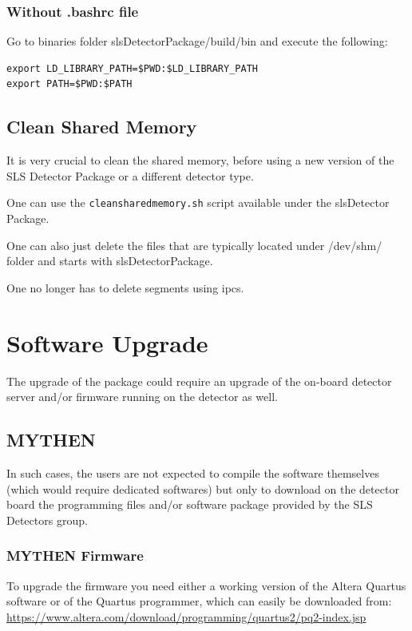 \documentclass{article}
\begin{document}
\subsubsection{Without .bashrc file}
Go to binaries folder slsDetectorPackage/build/bin and execute the following:
\begin{verbatim}
export LD_LIBRARY_PATH=$PWD:$LD_LIBRARY_PATH
export PATH=$PWD:$PATH
\end{verbatim}


\subsection{Clean Shared Memory}
It is very crucial to clean the shared memory, before using a new version of
the SLS Detector Package or a different detector type.

One can use the \verb=cleansharedmemory.sh= script available under the
slsDetector Package.

One can also just delete the files that are typically located under /dev/shm/ folder
and starts with slsDetectorPackage.

One no longer has to delete segments using ipcs.


\section{Software Upgrade}

The upgrade of the package could require an upgrade of the on-board detector
server and/or firmware running on the detector as well.


\subsection{MYTHEN}
In such cases, the users are not expected to compile the software
themselves (which would require dedicated softwares) but only to download on the
detector board the programming files and/or software package provided by
the SLS Detectors group.

\subsubsection{MYTHEN Firmware}

To upgrade the firmware you need either a working version of the Altera
Quartus software or of the Quartus programmer, which can easily be downloaded
from: \\
\url{https://www.altera.com/download/programming/quartus2/pq2-index.jsp}
\medskip
\end{document}

